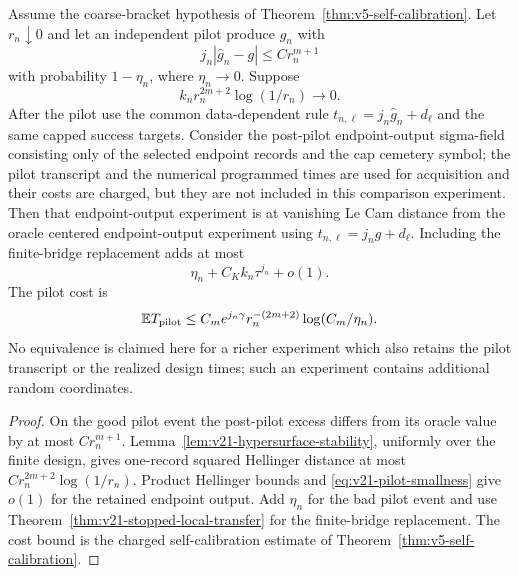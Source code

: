 \begin{corollary}
\label{cor:v21-pilot-centered}
Assume the coarse-bracket hypothesis of
Theorem~\ref{thm:v5-self-calibration}.  Let $r_n\downarrow0$ and let an
independent pilot produce $\widehat g_n$ with
\begin{equation}\label{eq:v21-pilot-gap}
 j_n|\widehat g_n-g|\le Cr_n^{m+1}
\end{equation}
with probability $1-\eta_n$, where $\eta_n\to0$.  Suppose
\begin{equation}\label{eq:v21-pilot-smallness}
 k_nr_n^{2m+2}\log(1/r_n)\longrightarrow0.
\end{equation}
After the pilot use the common data-dependent rule
$t_{n,\ell}=j_n\widehat g_n+d_\ell$ and the same capped success targets.
Consider the post-pilot endpoint-output sigma-field consisting only of the
selected endpoint records and the cap cemetery symbol; the pilot transcript
and the numerical programmed times are used for acquisition and their costs
are charged, but they are not included in this comparison experiment.  Then
that endpoint-output experiment is at vanishing Le Cam distance from the
oracle centered endpoint-output experiment using
$t_{n,\ell}=j_ng+d_\ell$.  Including the finite-bridge replacement adds at
most
\begin{equation}\label{eq:v21-pilot-total-error}
                    \eta_n+C_Kk_n\tau^{j_n}+o(1).
\end{equation}
The pilot cost is
\begin{equation}\label{eq:v21-pilot-cost}
 \mathbb ET_{\rm pilot}
 \le C_me^{j_n\gamma}r_n^{-(2m+2)}\log(C_m/\eta_n).
\end{equation}
No equivalence is claimed here for a richer experiment which also retains the
pilot transcript or the realized design times; such an experiment contains
additional random coordinates.
\end{corollary}

\begin{proof}
On the good pilot event the post-pilot excess differs from its oracle value by
at most $Cr_n^{m+1}$.  Lemma~\ref{lem:v21-hypersurface-stability}, uniformly
over the finite design, gives one-record squared Hellinger distance at most
$Cr_n^{2m+2}\log(1/r_n)$.  Product Hellinger bounds and
\eqref{eq:v21-pilot-smallness} give $o(1)$ for the retained endpoint output.
Add $\eta_n$ for the bad pilot event and use
Theorem~\ref{thm:v21-stopped-local-transfer} for the finite-bridge
replacement.  The cost bound is the charged self-calibration estimate of
Theorem~\ref{thm:v5-self-calibration}.
\end{proof}

